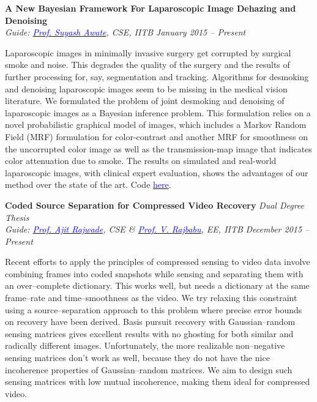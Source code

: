 \documentclass[margin,line]{res}
\newenvironment{list1}{
  \begin{list}{\ding{113}}{%
      \setlength{\itemsep}{0in}
      \setlength{\parsep}{0in} \setlength{\parskip}{0in}
      \setlength{\topsep}{0in} \setlength{\partopsep}{0in} 
      \setlength{\leftmargin}{0.17in}}}{\end{list}}
\begin{document}
\begin{resume}
{\bf A New Bayesian Framework For Laparoscopic Image Dehazing and Denoising} \\
{\em Guide: \href{https://www.cse.iitb.ac.in/~suyash}{\textcolor{blue}{Prof. Suyash Awate}}, CSE, IITB} \hfill {\it January 2015 -- Present} \\
\vspace*{-.13in}
\begin{list1}
\item[]
Laparoscopic images in minimally invasive surgery get corrupted by surgical smoke and noise. This degrades the quality of the surgery and the results of further processing for, say, segmentation and tracking. Algorithms for desmoking and denoising laparoscopic images seem to be missing in the medical vision literature. We formulated the problem of joint desmoking and denoising of laparoscopic images as a Bayesian inference problem. This formulation relies on a novel probabilistic graphical model of images, which includes a Markov Random Field (MRF) formulation for color-contrast and another MRF for smoothness on the uncorrupted color image as well as the transmission-map image that indicates color attenuation due to smoke. The results on simulated and real-world laparoscopic images, with clinical expert evaluation, shows the advantages of our method over the state of the art. Code \href{https://github.com/alankarkotwal/lap-dehazing}{\textcolor{blue} {here}}.
\end{list1}

{\bf Coded Source Separation for Compressed Video Recovery} \hfill \textit{Dual Degree Thesis} \\
{\em Guide: \href{https://www.cse.iitb.ac.in/~ajitvr}{\textcolor{blue}{Prof. Ajit Rajwade}}, CSE \& \href{https://www.ee.iitb.ac.in/wiki/faculty/rajbabu}{\textcolor{blue}{Prof. V. Rajbabu}}, EE, IITB} \hfill {\it December 2015 -- Present} \\
\vspace*{-.13in}
\begin{list1}
\item[]
Recent efforts to apply the principles of compressed sensing to video data involve combining frames into coded snapshots while sensing and separating them with an over--complete dictionary. This works well, but needs a dictionary at the same frame--rate and time--smoothness as the video. We try relaxing this constraint using a source--separation approach to this problem where precise error bounds on recovery have been derived. Basis pursuit recovery with Gaussian--random sensing matrices gives excellent results with no ghosting for both similar and radically different images. Unfortunately, the more realizable non--negative sensing matrices don't work as well, because they do not have the nice incoherence properties of Gaussian--random matrices. We aim to design such sensing matrices with low mutual incoherence, making them ideal for compressed video.
\end{list1}


\end{resume}
\end{document}
